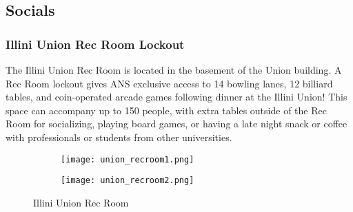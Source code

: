 \subsection{Socials}

\subsubsection{Illini Union Rec Room Lockout}
The Illini Union Rec Room is located in the basement of the Union building. A Rec Room lockout gives ANS exclusive access to 14 bowling lanes, 12 billiard tables, and coin-operated arcade games following dinner at the Illini Union! This space can accompany up to 150 people, with extra tables outside of the Rec Room for socializing, playing board games, or having a late night snack or coffee with professionals or students from other universities.
\vspace{0.5cm}\newline
\begin{figure}[H]
	\centering
	\begin{subfigure}{0.5\textwidth}
		\centering
		\texttt{[image: union\_recroom1.png]}
	\end{subfigure}%
	\begin{subfigure}{0.5\textwidth}
		\centering
		\texttt{[image: union\_recroom2.png]}
	\end{subfigure}	
	\caption{Illini Union Rec Room}	
\end{figure} 

